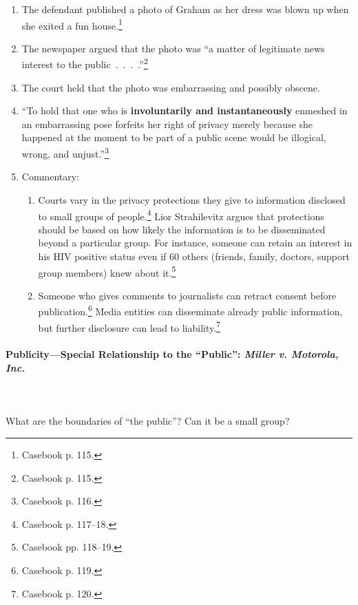 \begin{enumerate}
    \item The defendant published a photo of Graham as her dress was blown up 
    when she exited a fun house.\footnote{Casebook p. 115.}
    \item The newspaper argued that the photo was ``a matter of legitimate news 
    interest to the public~.~.~.~.''\footnote{Casebook p. 115.}
    \item The court held that the photo was embarrassing and possibly obscene.
    \item ``To hold that one who is \textbf{involuntarily and instantaneously} 
    enmeshed in an embarrassing pose forfeits her right of privacy merely 
    because she happened at the moment to be part of a public scene would be 
    illogical, wrong, and unjust.''\footnote{Casebook p. 116.}
    \item Commentary:
    \begin{enumerate}
        \item Courts vary in the privacy protections they give to information 
        disclosed to small groups of people.\footnote{Casebook p. 117--18.} Lior 
        Strahilevitz argues that protections should be based on how likely the 
        information is to be disseminated beyond a particular group. For 
        instance, someone can retain an interest in his HIV positive status even 
        if 60 others (friends, family, doctors, support group members) knew 
        about it.\footnote{Casebook pp. 118--19.}
        \item Someone who gives comments to journalists can retract consent 
        before publication.\footnote{Casebook p. 119.} Media entities can 
        disseminate already public information, but further disclosure can lead 
        to liability.\footnote{Casebook p. 120.}
    \end{enumerate}
\end{enumerate}

\paragraph{Publicity---Special Relationship to the ``Public'': \emph{Miller v. 
Motorola, Inc.}}
~\\\\
What are the boundaries of ``the public''? Can it be a small group?

